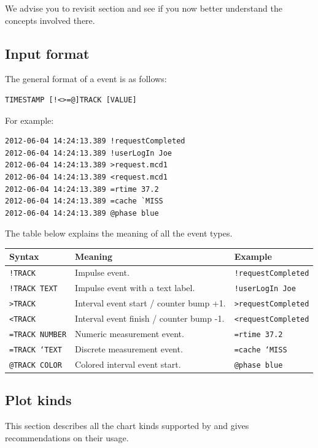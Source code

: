 \documentclass{article}
\begin{document}
We advise you to revisit section  and see if you now better understand the concepts involved there.

\pagebreak
\subsection{Input format}
\label{sec:tplot-input-format}

The general format of a \timeplot{} event is as follows:
\begin{verbatim}
TIMESTAMP [!<>=@]TRACK [VALUE]
\end{verbatim}

For example:
\begin{verbatim}
2012-06-04 14:24:13.389 !requestCompleted
2012-06-04 14:24:13.389 !userLogIn Joe
2012-06-04 14:24:13.389 >request.mcd1
2012-06-04 14:24:13.389 <request.mcd1
2012-06-04 14:24:13.389 =rtime 37.2
2012-06-04 14:24:13.389 =cache `MISS
2012-06-04 14:24:13.389 @phase blue
\end{verbatim}

The table below explains the meaning of all the event types.

\begin{tabular}{|l|p{200px}|l|}
\hline
Syntax & Meaning & Example \\
\hline
\texttt{!TRACK} & Impulse event. & \texttt{!requestCompleted} \\
\hline
\texttt{!TRACK TEXT} & Impulse event with a text label. & \texttt{!userLogIn Joe} \\
\hline
\texttt{>TRACK} & Interval event start / counter bump +1. & \texttt{>requestCompleted} \\
\hline
\texttt{<TRACK} & Interval event finish / counter bump -1. & \texttt{<requestCompleted} \\
\hline
\texttt{=TRACK NUMBER} & Numeric measurement event. & \texttt{=rtime 37.2} \\
\hline
\texttt{=TRACK `TEXT} & Discrete measurement event. & \texttt{=cache `MISS} \\
\hline
\texttt{@TRACK COLOR} & Colored interval event start. & \texttt{@phase blue} \\
\hline
\end{tabular}

\pagebreak
\subsection{Plot kinds}
\label{sec:tplot-plot-kinds}
This section describes all the chart kinds supported by \timeplot{} and gives recommendations on their usage.
\end{document}
